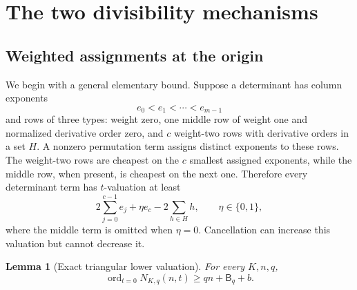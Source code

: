 \documentclass[11pt]{article}
\newtheorem{lemma}[theorem]{Lemma}
\theoremstyle{definition}
\theoremstyle{remark}
\newcommand{\ord}{\operatorname{ord}}
\newcommand{\Btri}{\mathsf B}
\theoremstyle{definition}
\theoremstyle{plain}
\numberwithin{equation}{section}
\begin{document}
\section{The two divisibility mechanisms}
\label{sb:sec:divisibility}

\subsection{Weighted assignments at the origin}
We begin with a general elementary bound.  Suppose a determinant has column
exponents
\[
 e_0<e_1<\cdots<e_{m-1}
\]
and rows of three types: weight zero, one middle row of weight one and
normalized derivative order zero, and $c$ weight-two rows with derivative
orders in a set $H$.  A nonzero permutation term assigns distinct exponents
to these rows.  The weight-two rows are cheapest on the $c$ smallest assigned
exponents, while the middle row, when present, is cheapest on the next one.
Therefore every determinant term has $t$-valuation at least
\begin{equation}
 2\sum_{j=0}^{c-1}e_j+\eta e_c-2\sum_{h\in H}h,
 \qquad \eta\in\{0,1\},
 \label{sb:eq:weighted-assignment-bound}
\end{equation}
where the middle term is omitted when $\eta=0$.  Cancellation can increase
this valuation but cannot decrease it.

\begin{lemma}[Exact triangular lower valuation]
\label{sb:lem:t-zero}
For every $K,n,q$,
\[
 \ord_{t=0}N_{K,q}(n,t)\ge qn+\Btri_q+b.
\]
\end{lemma}
\end{document}
